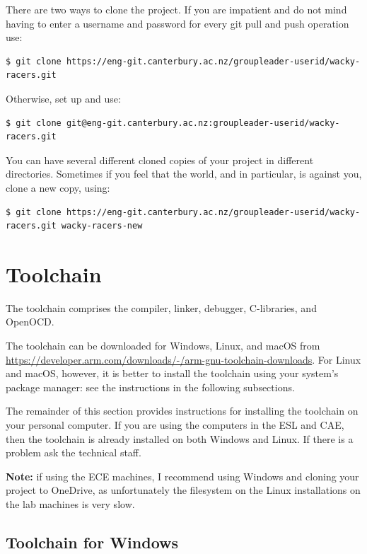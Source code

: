 There are two ways to clone the project. If you are impatient and do not
mind having to enter a username and password for every git pull and push
operation use:
%
\begin{verbatim}
$ git clone https://eng-git.canterbury.ac.nz/groupleader-userid/wacky-racers.git
\end{verbatim}

Otherwise, set up  and use:
%
\begin{verbatim}
$ git clone git@eng-git.canterbury.ac.nz:groupleader-userid/wacky-racers.git
\end{verbatim}

You can have several different cloned copies of your project in
different directories. Sometimes if you feel that the world,
and  in particular, is against you, clone a new copy,
using:
%
\begin{verbatim}
$ git clone https://eng-git.canterbury.ac.nz/groupleader-userid/wacky-racers.git wacky-racers-new
\end{verbatim}


\section{Toolchain}
\label{toolchain}

The toolchain comprises the compiler, linker, debugger, C-libraries,
and OpenOCD.

The toolchain can be downloaded for Windows, Linux, and macOS from
\url{https://developer.arm.com/downloads/-/arm-gnu-toolchain-downloads}. For
Linux and macOS, however, it is better to install the toolchain using your
system's package manager: see the instructions in the following subsections.

The remainder of this section provides instructions for installing the
toolchain on your personal computer. If you are using the computers in
the ESL and CAE, then the toolchain is already installed on both Windows
and Linux.  If there is a problem ask the technical staff.

\textbf{Note:} if using the ECE machines, I recommend using Windows and
cloning your project to OneDrive, as unfortunately the filesystem on the
Linux installations on the lab machines is very slow.


\subsection{Toolchain for Windows}

